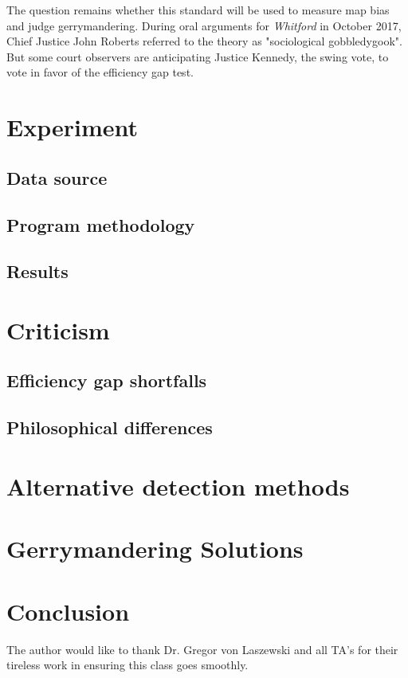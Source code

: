 \documentclass[sigconf]{acmart}
\begin{document}
The question remains whether this standard will be used to measure map bias and judge gerrymandering. During oral arguments for \textit{Whitford} in October 2017, Chief Justice John Roberts referred to the theory as "sociological gobbledygook".\cite{gilltranscript} But some court observers are anticipating Justice Kennedy, the swing vote, to vote in favor of the efficiency gap test.\cite{analysis}



\section{Experiment}
\subsection{Data source}
\subsection{Program methodology}
\subsection{Results}

\section{Criticism}
\subsection{Efficiency gap shortfalls}
\subsection{Philosophical differences}

\section{Alternative detection methods}

\section{Gerrymandering Solutions}

\section{Conclusion}


\begin{acks}

  The author would like to thank Dr. Gregor von Laszewski and all TA's for their tireless work in ensuring this class goes smoothly.

\end{acks}


 

\appendix


\end{document}
